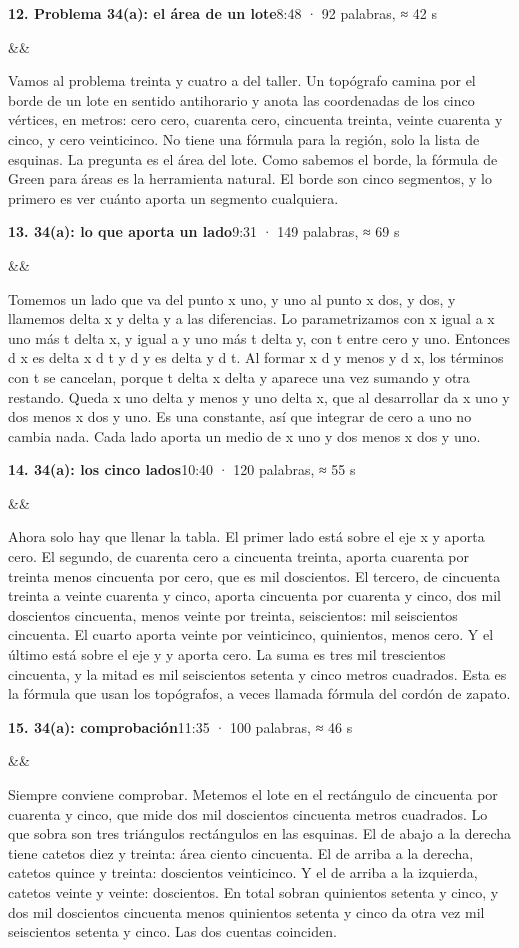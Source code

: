 \documentclass[14pt]{extarticle}
\newcommand{\capitulo}[1]{\vspace{14pt}{\color{tealx}\Large\bfseries #1}\par\vspace{2pt}}
\newcommand{\bloque}[3]{\needspace{5\baselineskip}\vspace{4pt}%
  {\color{navy}\bfseries #1}\hfill{\color{gray60}\small #2}\par
  \ifx&#3&\else{\color{brick}\small\bfseries #3}\par\fi}
\newcommand{\pausa}{\par\vspace{4pt}{\centering\color{brick}\bfseries — PAUSA 3 s —\par}\vspace{4pt}}
\begin{document}
\pausa
\capitulo{Problema 34(a)}
\bloque{12. Problema 34(a): el área de un lote}{8:48 · 92 palabras, ≈ 42 s}{}
Vamos al problema treinta y cuatro a del taller. Un topógrafo camina por el borde de un lote en sentido antihorario y anota las coordenadas de los cinco vértices, en metros: cero cero, cuarenta cero, cincuenta treinta, veinte cuarenta y cinco, y cero veinticinco. No tiene una fórmula para la región, solo la lista de esquinas. La pregunta es el área del lote. Como sabemos el borde, la fórmula de Green para áreas es la herramienta natural. El borde son cinco segmentos, y lo primero es ver cuánto aporta un segmento cualquiera.\par
\pausa
\bloque{13. 34(a): lo que aporta un lado}{9:31 · 149 palabras, ≈ 69 s}{}
Tomemos un lado que va del punto x uno, y uno al punto x dos, y dos, y llamemos delta x y delta y a las diferencias. Lo parametrizamos con x igual a x uno más t delta x, y igual a y uno más t delta y, con t entre cero y uno. Entonces d x es delta x d t y d y es delta y d t. Al formar x d y menos y d x, los términos con t se cancelan, porque t delta x delta y aparece una vez sumando y otra restando. Queda x uno delta y menos y uno delta x, que al desarrollar da x uno y dos menos x dos y uno. Es una constante, así que integrar de cero a uno no cambia nada. Cada lado aporta un medio de x uno y dos menos x dos y uno.\par
\pausa
\bloque{14. 34(a): los cinco lados}{10:40 · 120 palabras, ≈ 55 s}{}
Ahora solo hay que llenar la tabla. El primer lado está sobre el eje x y aporta cero. El segundo, de cuarenta cero a cincuenta treinta, aporta cuarenta por treinta menos cincuenta por cero, que es mil doscientos. El tercero, de cincuenta treinta a veinte cuarenta y cinco, aporta cincuenta por cuarenta y cinco, dos mil doscientos cincuenta, menos veinte por treinta, seiscientos: mil seiscientos cincuenta. El cuarto aporta veinte por veinticinco, quinientos, menos cero. Y el último está sobre el eje y y aporta cero. La suma es tres mil trescientos cincuenta, y la mitad es mil seiscientos setenta y cinco metros cuadrados. Esta es la fórmula que usan los topógrafos, a veces llamada fórmula del cordón de zapato.\par
\pausa
\bloque{15. 34(a): comprobación}{11:35 · 100 palabras, ≈ 46 s}{}
Siempre conviene comprobar. Metemos el lote en el rectángulo de cincuenta por cuarenta y cinco, que mide dos mil doscientos cincuenta metros cuadrados. Lo que sobra son tres triángulos rectángulos en las esquinas. El de abajo a la derecha tiene catetos diez y treinta: área ciento cincuenta. El de arriba a la derecha, catetos quince y treinta: doscientos veinticinco. Y el de arriba a la izquierda, catetos veinte y veinte: doscientos. En total sobran quinientos setenta y cinco, y dos mil doscientos cincuenta menos quinientos setenta y cinco da otra vez mil seiscientos setenta y cinco. Las dos cuentas coinciden.\par
\end{document}
